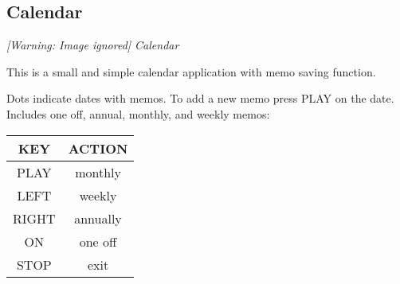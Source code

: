\subsection{Calendar}
{\centering\itshape
  [Warning: Image ignored] %
 \newline
Calendar
\par}

This is a small and simple calendar application with memo saving function.

Dots indicate dates with memos. To add a new memo press PLAY on the
date. Includes one off, annual, monthly, and weekly memos:

\begin{table}[h!]
\begin{tabular}{|c|c|}
\hline
KEY & ACTION \\\hline
PLAY & monthly \\\hline
LEFT & weekly \\\hline
RIGHT & annually \\\hline
ON & one off \\\hline
STOP & exit \\\hline
\end{tabular}
\end{table}


